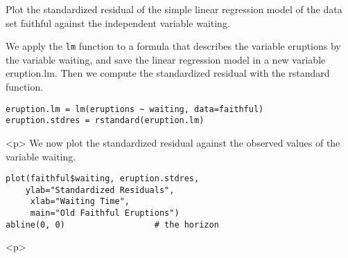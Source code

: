 Plot the standardized residual of the simple linear regression model of the data set faithful against the independent variable waiting.

We apply the \texttt{lm} function to a formula that describes the variable eruptions by the variable waiting, and save the linear regression model in a new variable eruption.lm. Then we compute the standardized residual with the rstandard function.


\begin{verbatim}
eruption.lm = lm(eruptions ~ waiting, data=faithful) 
eruption.stdres = rstandard(eruption.lm) 
\end{verbatim}
<p> 
We now plot the standardized residual against the observed values of the variable waiting.

\begin{verbatim}
plot(faithful$waiting, eruption.stdres, 
    ylab="Standardized Residuals", 
     xlab="Waiting Time", 
     main="Old Faithful Eruptions") 
abline(0, 0)                  # the horizon
\end{verbatim}
<p> 


